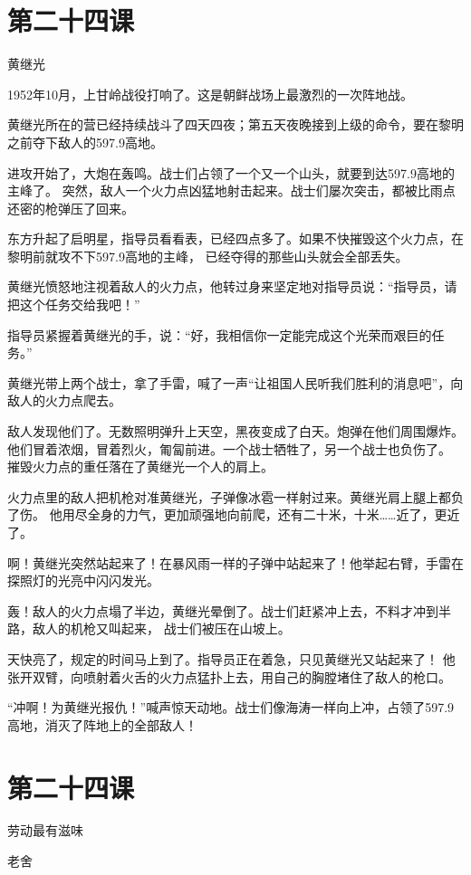\documentclass[12pt,UTF8]{ctexbook}
\begin{document}
\section{第二十四课}

黄继光

1952年10月，上甘岭战役打响了。这是朝鲜战场上最激烈的一次阵地战。

黄继光所在的营已经持续战斗了四天四夜；第五天夜晚接到上级的命令，要在黎明之前夺下敌人的597.9高地。

进攻开始了，大炮在轰鸣。战士们占领了一个又一个山头，就要到达597.9高地的主峰了。
突然，敌人一个火力点凶猛地射击起来。战士们屡次突击，都被比雨点还密的枪弹压了回来。

东方升起了启明星，指导员看看表，已经四点多了。如果不快摧毁这个火力点，在黎明前就攻不下597.9高地的主峰，
已经夺得的那些山头就会全部丢失。

黄继光愤怒地注视着敌人的火力点，他转过身来坚定地对指导员说：“指导员，请把这个任务交给我吧！”

指导员紧握着黄继光的手，说：“好，我相信你一定能完成这个光荣而艰巨的任务。”

黄继光带上两个战士，拿了手雷，喊了一声“让祖国人民听我们胜利的消息吧”，向敌人的火力点爬去。

敌人发现他们了。无数照明弹升上天空，黑夜变成了白天。炮弹在他们周围爆炸。
他们冒着浓烟，冒着烈火，匍匐前进。一个战士牺牲了，另一个战士也负伤了。
摧毁火力点的重任落在了黄继光一个人的肩上。

火力点里的敌人把机枪对准黄继光，子弹像冰雹一样射过来。黄继光肩上腿上都负了伤。
他用尽全身的力气，更加顽强地向前爬，还有二十米，十米……近了，更近了。

啊！黄继光突然站起来了！在暴风雨一样的子弹中站起来了！他举起右臂，手雷在探照灯的光亮中闪闪发光。

轰！敌人的火力点塌了半边，黄继光晕倒了。战士们赶紧冲上去，不料才冲到半路，敌人的机枪又叫起来，
战士们被压在山坡上。

天快亮了，规定的时间马上到了。指导员正在着急，只见黄继光又站起来了！
他张开双臂，向喷射着火舌的火力点猛扑上去，用自己的胸膛堵住了敌人的枪口。

“冲啊！为黄继光报仇！”喊声惊天动地。战士们像海涛一样向上冲，占领了597.9高地，消灭了阵地上的全部敌人！

\section{第二十四课}

劳动最有滋味

老舍
\end{document}
